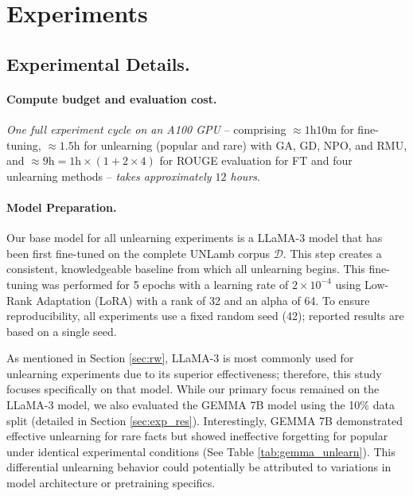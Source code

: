 \section{Experiments}

\subsection{Experimental Details.}
\label{sec:experiments}

\paragraph{Compute budget and evaluation cost.}
\textit{One full experiment cycle on an A100 GPU} -- comprising $\approx1\text{h}10\text{m}$ for fine-tuning, $\approx1.5\text{h}$ for unlearning (popular and rare) with GA, GD, NPO, and RMU, and $\approx9\text{h}=1\text{h}\times\left(1+2\times4\right)$ for ROUGE evaluation for FT and four unlearning methods -- \textit{takes approximately $12$ hours}.


\paragraph{Model Preparation.}
Our base model for all unlearning experiments is a LLaMA-3 model that has been first fine-tuned on the complete UNLamb corpus $\mathcal{D}$. This step creates a consistent, knowledgeable baseline from which all unlearning begins. This fine-tuning was performed for 5 epochs with a learning rate of $2 \times 10^{-4}$ using Low-Rank Adaptation (LoRA) with a rank of 32 and an alpha of 64. 
To ensure reproducibility, all experiments use a fixed random seed (42); reported results are based on a single seed.

As mentioned in Section \ref{sec:rw}, LLaMA-3 is most commonly used for unlearning experiments due to its superior effectiveness; therefore, this study focuses specifically on that model. While our primary focus remained on the LLaMA-3 model, we also evaluated the GEMMA 7B model using the 10\% data split (detailed in Section \ref{sec:exp_res}). Interestingly, GEMMA 7B demonstrated effective unlearning for rare facts but showed ineffective forgetting for popular under identical experimental conditions (See Table \ref{tab:gemma_unlearn}). This differential unlearning behavior could potentially be attributed to variations in model architecture or pretraining specifics.


